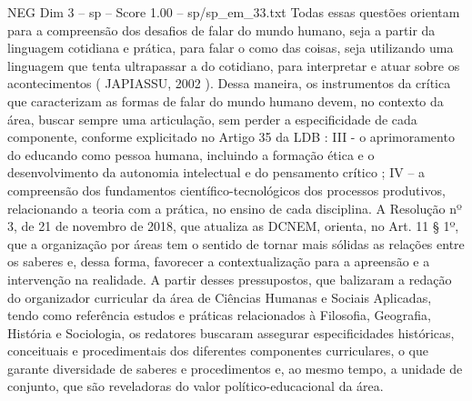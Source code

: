 \begin{textsample}{NEG Dim 3 – sp – Score 1.00 – sp/sp\_em\_33.txt}
Todas essas questões orientam para a compreensão dos desafios de falar do mundo humano, seja a partir da linguagem cotidiana e prática, para falar o como das coisas, seja utilizando uma linguagem que tenta ultrapassar a do cotidiano, para interpretar e atuar sobre os acontecimentos ( JAPIASSU, 2002 ).
Dessa maneira, os instrumentos da crítica que caracterizam as formas de falar do mundo humano devem, no contexto da área, buscar sempre uma articulação, sem perder a especificidade de cada componente, conforme explicitado no Artigo 35 da LDB : III - o aprimoramento do educando como pessoa humana, incluindo a formação ética e o desenvolvimento da autonomia intelectual e do pensamento crítico ; IV – a compreensão dos fundamentos científico-tecnológicos dos processos produtivos, relacionando a teoria com a prática, no ensino de cada disciplina.
A Resolução nº 3, de 21 de novembro de 2018, que atualiza as DCNEM, orienta, no Art. 11 § 1º, que a organização por áreas tem o sentido de tornar mais sólidas as relações entre os saberes e, dessa forma, favorecer a contextualização para a apreensão e a intervenção na realidade.
A partir desses pressupostos, que balizaram a redação do organizador curricular da área de Ciências Humanas e Sociais Aplicadas, tendo como referência estudos e práticas relacionados à Filosofia, Geografia, História e Sociologia, os redatores buscaram assegurar especificidades históricas, conceituais e procedimentais dos diferentes componentes curriculares, o que garante diversidade de saberes e procedimentos e, ao mesmo tempo, a unidade de conjunto, que são reveladoras do valor político-educacional da área.

\end{textsample}
